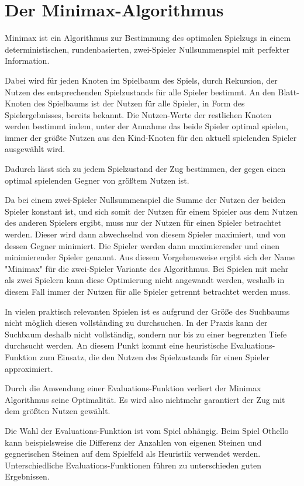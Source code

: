 \section{Der Minimax-Algorithmus}

Minimax ist ein Algorithmus zur Bestimmung des optimalen Spielzugs in einem deterministischen, rundenbasierten, zwei-Spieler Nullsummenspiel mit perfekter Information.

Dabei wird für jeden Knoten im Spielbaum des Spiels, durch Rekursion, der Nutzen des entsprechenden Spielzustands für alle Spieler bestimmt.
An den Blatt-Knoten des Spielbaums ist der Nutzen für alle Spieler, in Form des Spielergebnisses, bereits bekannt.
Die Nutzen-Werte der restlichen Knoten werden bestimmt indem, unter der Annahme das beide Spieler optimal spielen, immer der größte Nutzen aus den Kind-Knoten für den aktuell spielenden Spieler ausgewählt wird.
\cite[S.~165]{ai2010russel}

Dadurch lässt sich zu jedem Spielzustand der Zug bestimmen, der gegen einen optimal spielenden Gegner von größtem Nutzen ist.

Da bei einem zwei-Spieler Nullsummenspiel die Summe der Nutzen der beiden Spieler konstant ist, und sich somit der Nutzen für einem Spieler aus dem Nutzen des anderen Spielers ergibt, muss nur der Nutzen
für einen Spieler betrachtet werden. Dieser wird dann abwechselnd von diesem Spieler maximiert, und von dessen Gegner minimiert. Die Spieler werden dann maximierender und einen minimierender Spieler genannt.
Aus diesem Vorgehensweise ergibt sich der Name "Minimax" für die zwei-Spieler Variante des Algorithmus.
Bei Spielen mit mehr als zwei Spielern kann diese Optimierung nicht angewandt werden, weshalb in diesem Fall immer der Nutzen für alle Spieler getrennt betrachtet werden muss.
\cite[S.~165]{ai2010russel}

In vielen praktisch relevanten Spielen ist es aufgrund der Größe des Suchbaums nicht möglich diesen vollständing zu durchsuchen.
In der Praxis kann der Suchbaum deshalb nicht vollständig, sondern nur bis zu einer begrenzten Tiefe durchsucht werden. An diesem Punkt kommt eine heuristische Evaluations-Funktion zum Einsatz,
die den Nutzen des Spielzustands für einen Spieler approximiert.
\cite[S.~171]{ai2010russel}

Durch die Anwendung einer Evaluations-Funktion verliert der Minimax Algorithmus seine Optimalität. Es wird also nichtmehr garantiert der Zug mit dem größten Nutzen gewählt.

Die Wahl der Evaluations-Funktion ist vom Spiel abhängig. Beim Spiel Othello kann beispielsweise die Differenz der Anzahlen von eigenen Steinen und gegnerischen Steinen auf dem Spielfeld als Heuristik verwendet werden.
Unterschiedliche Evaluations-Funktionen führen zu unterschieden guten Ergebnissen.

